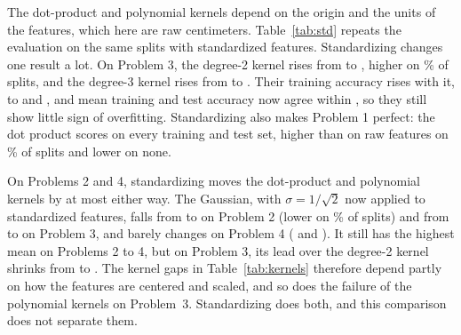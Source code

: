 The dot-product and polynomial kernels depend on the origin and the units of the features, which here are raw centimeters. Table~\ref{tab:std} repeats the evaluation on the same splits with standardized features. Standardizing changes one result a lot. On Problem 3, the degree-2 kernel rises from  to , higher on \% of splits, and the degree-3 kernel rises from  to . Their training accuracy rises with it, to  and , and mean training and test accuracy now agree within , so they still show little sign of overfitting. Standardizing also makes Problem 1 perfect: the dot product scores  on every training and test set, higher than on raw features on \% of splits and lower on none.

\begin{table}[t]
\caption{Test accuracy on raw and standardized features, same  splits per row. ``Higher / lower'' is the share of splits on which standardizing raised or lowered accuracy.}
\label{tab:std}
\centering
\footnotesize
\setlength{\tabcolsep}{3pt}

\end{table}

On Problems 2 and 4, standardizing moves the dot-product and polynomial kernels by at most  either way. The Gaussian, with $\sigma = 1/\sqrt{2}$ now applied to standardized features, falls from  to  on Problem 2 (lower on \% of splits) and from  to  on Problem 3, and barely changes on Problem 4 ( and ). It still has the highest mean on Problems 2 to 4, but on Problem 3, its lead over the degree-2 kernel shrinks from  to . The kernel gaps in Table~\ref{tab:kernels} therefore depend partly on how the features are centered and scaled, and so does the failure of the polynomial kernels on Problem~3. Standardizing does both, and this comparison does not separate them.
